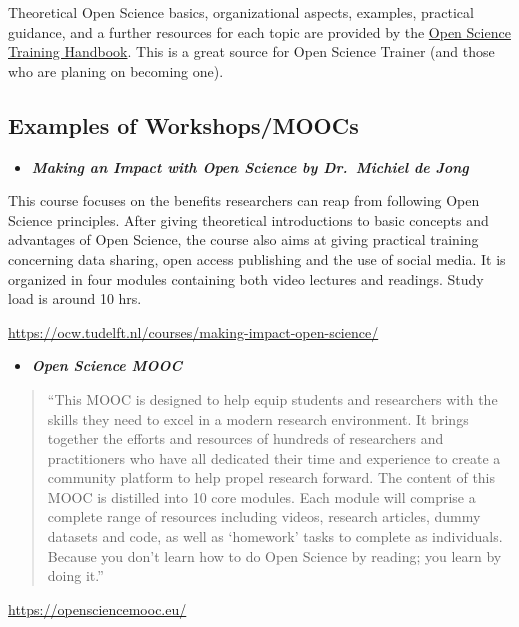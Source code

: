 \documentclass[12pt,]{report}
\providecommand{\tightlist}{%
  \setlength{\itemsep}{0pt}\setlength{\parskip}{0pt}}
\begin{document}
Theoretical Open Science basics, organizational aspects, examples,
practical guidance, and a further resources for each topic are provided
by the
\href{https://open-science-training-handbook.gitbooks.io/book/content/}{Open
Science Training Handbook}. This is a great source for Open Science
Trainer (and those who are planing on becoming one).

\subsection{Examples of
Workshops/MOOCs}\label{examples-of-workshopsmoocs}

\begin{itemize}
\tightlist
\item
  \textbf{\emph{Making an Impact with Open Science by Dr.~Michiel de
  Jong}}
\end{itemize}

This course focuses on the benefits researchers can reap from following
Open Science principles. After giving theoretical introductions to basic
concepts and advantages of Open Science, the course also aims at giving
practical training concerning data sharing, open access publishing and
the use of social media. It is organized in four modules containing both
video lectures and readings. Study load is around 10 hrs.

\url{https://ocw.tudelft.nl/courses/making-impact-open-science/}

\begin{itemize}
\tightlist
\item
  \textbf{\emph{Open Science MOOC}}
\end{itemize}

\begin{quote}
``This MOOC is designed to help equip students and researchers with the
skills they need to excel in a modern research environment. It brings
together the efforts and resources of hundreds of researchers and
practitioners who have all dedicated their time and experience to create
a community platform to help propel research forward. The content of
this MOOC is distilled into 10 core modules. Each module will comprise a
complete range of resources including videos, research articles, dummy
datasets and code, as well as `homework' tasks to complete as
individuals. Because you don't learn how to do Open Science by reading;
you learn by doing it.''
\end{quote}

\url{https://opensciencemooc.eu/}
\end{document}
